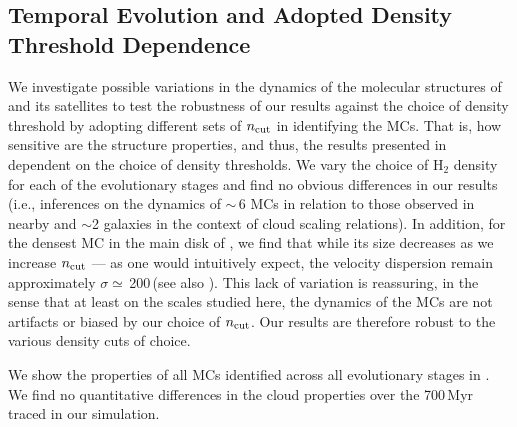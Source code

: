 \IfFileExists{emulateapjlegacy.cls}{\documentclass[iop]{emulateapjlegacy}}{\documentclass[iop]{emulateapj}}
\begin{document}
\subsection{Temporal Evolution and Adopted Density Threshold Dependence}\label{sec:ncut}
We investigate possible variations in the dynamics of the molecular structures of \flower and its satellites to test the robustness of our results against the choice of density threshold by adopting
different sets of $n_{\rm cut}$ in identifying the MCs.
%
That is, how sensitive are the structure properties, and thus, the results presented in  dependent on the choice of density thresholds. We vary the choice of H$_2$ density for each of the evolutionary stages and find no obvious differences in our results (i.e., inferences on the dynamics of \z$\sim$\,6 MCs in relation to those observed in nearby and \z$\sim$2 galaxies in the context of
cloud scaling relations).
%
In addition, for the densest MC in the main disk of \flower, we find that while its size decreases as we increase $n_{\rm cut}$ --- as one would intuitively expect, the velocity dispersion remain approximately $\sigma\simeq$\,200\,\kms (see also ).
%
This lack of variation is reassuring, in the sense that at least on the scales studied here, the dynamics of the MCs are not artifacts or biased by our choice of $n_{\rm cut}$. Our results are therefore robust to the various density cuts of choice.

We show the properties of all MCs identified across all evolutionary stages in . We find no quantitative differences in the cloud properties over the 700\,Myr traced in our simulation.
\end{document}
